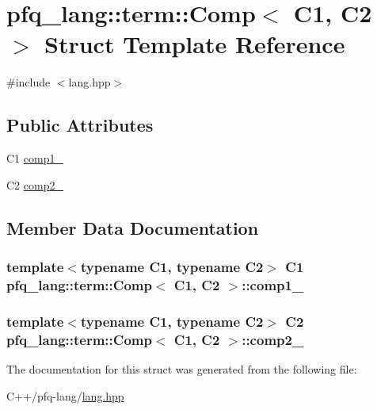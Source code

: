 \hypertarget{structpfq__lang_1_1term_1_1Comp}{\section{pfq\-\_\-lang\-:\-:term\-:\-:Comp$<$ C1, C2 $>$ Struct Template Reference}
\label{structpfq__lang_1_1term_1_1Comp}
}


{\ttfamily \#include $<$lang.\-hpp$>$}

\subsection*{Public Attributes}
\begin{DoxyCompactItemize}
\item 
C1 \hyperlink{structpfq__lang_1_1term_1_1Comp_a627462a10b6c14fce82c8b2425d808ca}{comp1\-\_\-}
\item 
C2 \hyperlink{structpfq__lang_1_1term_1_1Comp_abedc337ebe11815017c547655d3e23ad}{comp2\-\_\-}
\end{DoxyCompactItemize}


\subsection{Member Data Documentation}
\hypertarget{structpfq__lang_1_1term_1_1Comp_a627462a10b6c14fce82c8b2425d808ca}{
\subsubsection[{comp1\-\_\-}]{\setlength{\rightskip}{0pt plus 5cm}template$<$typename C1, typename C2$>$ C1 {\bf pfq\-\_\-lang\-::term\-::\-Comp}$<$ C1, C2 $>$\-::comp1\-\_\-}}\label{structpfq__lang_1_1term_1_1Comp_a627462a10b6c14fce82c8b2425d808ca}
\hypertarget{structpfq__lang_1_1term_1_1Comp_abedc337ebe11815017c547655d3e23ad}{
\subsubsection[{comp2\-\_\-}]{\setlength{\rightskip}{0pt plus 5cm}template$<$typename C1, typename C2$>$ C2 {\bf pfq\-\_\-lang\-::term\-::\-Comp}$<$ C1, C2 $>$\-::comp2\-\_\-}}\label{structpfq__lang_1_1term_1_1Comp_abedc337ebe11815017c547655d3e23ad}


The documentation for this struct was generated from the following file\-:\begin{DoxyCompactItemize}
\item 
C++/pfq-\/lang/\hyperlink{lang_8hpp}{lang.\-hpp}\end{DoxyCompactItemize}
